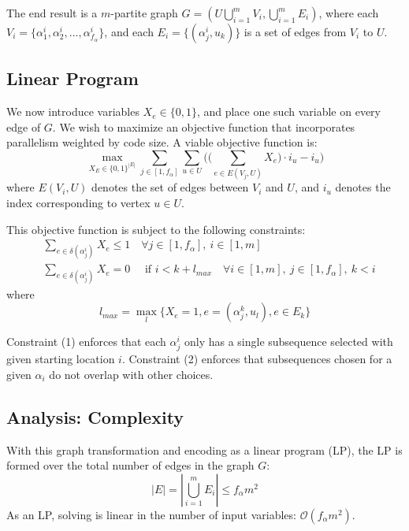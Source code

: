 \documentclass[12pt,twoside]{article}
\begin{document}
The end result is a $m$-partite graph $G = (U \bigcup\limits_{i=1}^{m} V_i, \bigcup_{i=1}^{m} E_i)$, where each $V_i = \{\alpha_1^i, \alpha_2^i, ... , \alpha_{f_{\alpha}}^i\}$, and each $E_i = \{(\alpha_j^i, u_k)\}$ is a set of edges from $V_i$ to $U$.

\subsection{Linear Program}
We now introduce variables $X_e \in \{0,1\}$, and place one such variable on every edge of $G$. We wish to maximize an objective function that incorporates parallelism weighted by code size. A viable objective function is:
	\begin{equation}
		\max_{X_E \in \{0,1\}^{|E|}} \sum_{j \in [1,f_{\alpha}]}  \sum_{u \in U}\bigg(\Big(\sum_{e \in E(V_j,U)} X_e\Big) \cdot i_u - i_u\bigg) 
	\end{equation}
	where $E(V_i,U)$ denotes the set of edges between $V_i$ and $U$, and $i_u$ denotes the index corresponding to vertex $u \in U$.

	This objective function is subject to the following constraints:
	\begin{align}
		&\sum_{e \in \delta(\alpha_j^i)} X_e \leq 1 \quad \forall j \in [1, f_{\alpha}],\ i \in [1, m] \tag{1} \\
		&\sum_{e \in \delta(\alpha_j^i)} X_e = 0 \quad \text{ if } i < k + l_{max} \quad \forall i \in [1,m],\ j \in [1,f_{\alpha}],\ k<i \tag{2}
	\end{align}
	where \begin{equation}
		l_{max} = \max_l \{X_e = 1, e = ( \alpha_j^k, u_l), e \in E_k\}
	\end{equation}

	Constraint (1) enforces that each $\alpha_j^i$ only has a single subsequence selected with given starting location $i$. Constraint (2) enforces that subsequences chosen for a given $\alpha_i$ do not overlap with other choices.   

\subsection{Analysis: Complexity}
With this graph transformation and encoding as a linear program (LP), the LP is formed over the total number of edges in the graph $G$:
	\begin{equation}
		|E| = |\bigcup_{i=1}^m E_i| \leq f_{\alpha}m^2 
	\end{equation}
	As an LP, solving is linear in the number of input variables: $\mathcal{O}(f_{\alpha}m^2)$. 
\end{document}

